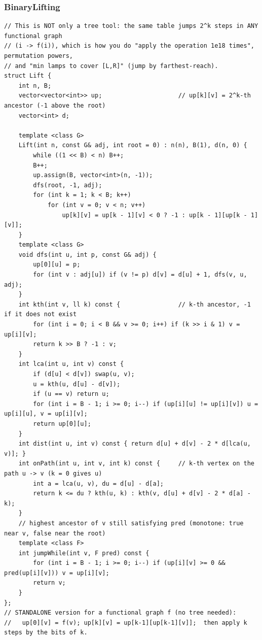 \documentclass[9pt,a4paper,twocolumn]{extarticle}
\begin{document}
\subsubsection{BinaryLifting}
\nopagebreak
\begin{lstlisting}
// This is NOT only a tree tool: the same table jumps 2^k steps in ANY functional graph
// (i -> f(i)), which is how you do "apply the operation 1e18 times", permutation powers,
// and "min lamps to cover [L,R]" (jump by farthest-reach).
struct Lift {
    int n, B;
    vector<vector<int>> up;                     // up[k][v] = 2^k-th ancestor (-1 above the root)
    vector<int> d;

    template <class G>
    Lift(int n, const G& adj, int root = 0) : n(n), B(1), d(n, 0) {
        while ((1 << B) < n) B++;
        B++;
        up.assign(B, vector<int>(n, -1));
        dfs(root, -1, adj);
        for (int k = 1; k < B; k++)
            for (int v = 0; v < n; v++)
                up[k][v] = up[k - 1][v] < 0 ? -1 : up[k - 1][up[k - 1][v]];
    }
    template <class G>
    void dfs(int u, int p, const G& adj) {
        up[0][u] = p;
        for (int v : adj[u]) if (v != p) d[v] = d[u] + 1, dfs(v, u, adj);
    }
    int kth(int v, ll k) const {                // k-th ancestor, -1 if it does not exist
        for (int i = 0; i < B && v >= 0; i++) if (k >> i & 1) v = up[i][v];
        return k >> B ? -1 : v;
    }
    int lca(int u, int v) const {
        if (d[u] < d[v]) swap(u, v);
        u = kth(u, d[u] - d[v]);
        if (u == v) return u;
        for (int i = B - 1; i >= 0; i--) if (up[i][u] != up[i][v]) u = up[i][u], v = up[i][v];
        return up[0][u];
    }
    int dist(int u, int v) const { return d[u] + d[v] - 2 * d[lca(u, v)]; }
    int onPath(int u, int v, int k) const {     // k-th vertex on the path u -> v (k = 0 gives u)
        int a = lca(u, v), du = d[u] - d[a];
        return k <= du ? kth(u, k) : kth(v, d[u] + d[v] - 2 * d[a] - k);
    }
    // highest ancestor of v still satisfying pred (monotone: true near v, false near the root)
    template <class F>
    int jumpWhile(int v, F pred) const {
        for (int i = B - 1; i >= 0; i--) if (up[i][v] >= 0 && pred(up[i][v])) v = up[i][v];
        return v;
    }
};
// STANDALONE version for a functional graph f (no tree needed):
//   up[0][v] = f(v); up[k][v] = up[k-1][up[k-1][v]];  then apply k steps by the bits of k.
\end{lstlisting}
\end{document}
